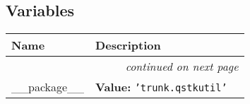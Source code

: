 
  \subsection{Variables}

    \vspace{-1cm}
\hspace{\varindent}\begin{longtable}{|p{\varnamewidth}|p{\vardescrwidth}|l}
\cline{1-2}
\cline{1-2} \centering \textbf{Name} & \centering \textbf{Description}& \\
\cline{1-2}
\endhead\cline{1-2}\multicolumn{3}{r}{\small\textit{continued on next page}}\\\endfoot\cline{1-2}
\endlastfoot\raggedright \_\-\_\-p\-a\-c\-k\-a\-g\-e\-\_\-\_\- & \raggedright \textbf{Value:} 
{\tt \texttt{'}\texttt{trunk.qstkutil}\texttt{'}}&\\
\cline{1-2}
\end{longtable}

